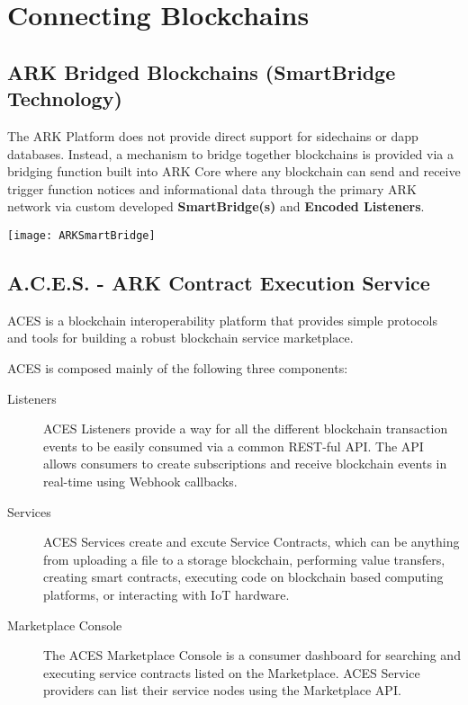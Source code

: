\documentclass[11pt,fleqn,oneside]{book} %
\begin{document}
\section{Connecting Blockchains}
\subsection{ARK Bridged Blockchains (SmartBridge Technology)}
The ARK Platform does not provide direct support for sidechains or dapp databases.
Instead, a mechanism to bridge together blockchains is provided via a bridging
function built into ARK Core where any blockchain can send and receive trigger
function notices and informational data through the primary ARK network via
custom developed \textbf{SmartBridge(s)} and \textbf{Encoded Listeners}.
\begin{center}
	\texttt{[image: ARKSmartBridge]}
\end{center}

\subsection{A.C.E.S. - ARK Contract Execution Service}
ACES is a blockchain interoperability platform that provides simple protocols and tools for building a robust blockchain 
service marketplace.

ACES is composed mainly of the following three components:
\begin{description}
	\item[Listeners] ACES Listeners provide a way for all the different blockchain transaction events to be easily 
	consumed via a common REST-ful API. The API allows consumers to create subscriptions and receive blockchain events 
	in real-time using Webhook callbacks.
	\item[Services] ACES Services create and excute Service Contracts, which can be anything from uploading 
	a file to a storage blockchain, performing value transfers, creating smart contracts, executing code on 
	blockchain based computing platforms, or interacting with IoT hardware.
	\item[Marketplace Console] The ACES Marketplace Console is a consumer dashboard for searching and executing 
	service contracts listed on the Marketplace. ACES Service providers can list their service nodes using the Marketplace API.
\end{description}
\end{document}
